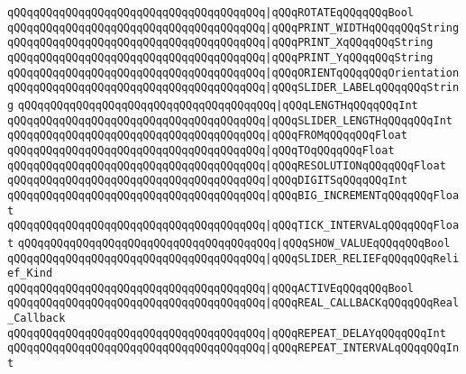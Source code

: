 \verb|qQQqqQQqqQQqqQQqqQQqqQQqqQQqqQQqqQQqqQQq|\verb#|qQQqROTATEqQQqqQQqBool#\newline
\verb|qQQqqQQqqQQqqQQqqQQqqQQqqQQqqQQqqQQqqQQq|\verb#|qQQqPRINT_WIDTHqQQqqQQqString#\newline
\verb|qQQqqQQqqQQqqQQqqQQqqQQqqQQqqQQqqQQqqQQq|\verb#|qQQqPRINT_XqQQqqQQqString#\newline
\verb|qQQqqQQqqQQqqQQqqQQqqQQqqQQqqQQqqQQqqQQq|\verb#|qQQqPRINT_YqQQqqQQqString#\newline
\verb|qQQqqQQqqQQqqQQqqQQqqQQqqQQqqQQqqQQqqQQq|\verb#|qQQqORIENTqQQqqQQqOrientation#\newline
\verb|qQQqqQQqqQQqqQQqqQQqqQQqqQQqqQQqqQQqqQQq|\verb#|qQQqSLIDER_LABELqQQqqQQqString#\newline
\verb|qQQqqQQqqQQqqQQqqQQqqQQqqQQqqQQqqQQqqQQq|\verb#|qQQqLENGTHqQQqqQQqInt#\newline
\verb|qQQqqQQqqQQqqQQqqQQqqQQqqQQqqQQqqQQqqQQq|\verb#|qQQqSLIDER_LENGTHqQQqqQQqInt#\newline
\verb|qQQqqQQqqQQqqQQqqQQqqQQqqQQqqQQqqQQqqQQq|\verb#|qQQqFROMqQQqqQQqFloat#\newline
\verb|qQQqqQQqqQQqqQQqqQQqqQQqqQQqqQQqqQQqqQQq|\verb#|qQQqTOqQQqqQQqFloat#\newline
\verb|qQQqqQQqqQQqqQQqqQQqqQQqqQQqqQQqqQQqqQQq|\verb#|qQQqRESOLUTIONqQQqqQQqFloat#\newline
\verb|qQQqqQQqqQQqqQQqqQQqqQQqqQQqqQQqqQQqqQQq|\verb#|qQQqDIGITSqQQqqQQqInt#\newline
\verb|qQQqqQQqqQQqqQQqqQQqqQQqqQQqqQQqqQQqqQQq|\verb#|qQQqBIG_INCREMENTqQQqqQQqFloat#\newline
\verb|qQQqqQQqqQQqqQQqqQQqqQQqqQQqqQQqqQQqqQQq|\verb#|qQQqTICK_INTERVALqQQqqQQqFloat#\newline
\verb|qQQqqQQqqQQqqQQqqQQqqQQqqQQqqQQqqQQqqQQq|\verb#|qQQqSHOW_VALUEqQQqqQQqBool#\newline
\verb|qQQqqQQqqQQqqQQqqQQqqQQqqQQqqQQqqQQqqQQq|\verb#|qQQqSLIDER_RELIEFqQQqqQQqRelief_Kind#\newline
\verb|qQQqqQQqqQQqqQQqqQQqqQQqqQQqqQQqqQQqqQQq|\verb#|qQQqACTIVEqQQqqQQqBool#\newline
\verb|qQQqqQQqqQQqqQQqqQQqqQQqqQQqqQQqqQQqqQQq|\verb#|qQQqREAL_CALLBACKqQQqqQQqReal_Callback#\newline
\verb|qQQqqQQqqQQqqQQqqQQqqQQqqQQqqQQqqQQqqQQq|\verb#|qQQqREPEAT_DELAYqQQqqQQqInt#\newline
\verb|qQQqqQQqqQQqqQQqqQQqqQQqqQQqqQQqqQQqqQQq|\verb#|qQQqREPEAT_INTERVALqQQqqQQqInt#\newline
